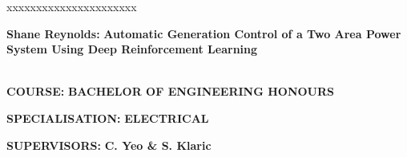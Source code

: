 \documentclass[11pt]{article}
\begin{document}

\begin{namelist}{xxxxxxxxxxxxxxxxxxxxxx}
\item[{\bf Shane Reynolds:}]
	{\bf Automatic Generation Control of a Two Area Power\\ System Using Deep Reinforcement Learning}\\ \\
\item[{\bf COURSE:}]
	{\bf BACHELOR OF ENGINEERING HONOURS}
\item[{\bf SPECIALISATION:}]
	{\bf ELECTRICAL}
\item[{\bf SUPERVISORS:}]
	{\bf C. Yeo \& S. Klaric}
\end{namelist}

\vspace{0.044\paperheight} %


\end{document}
